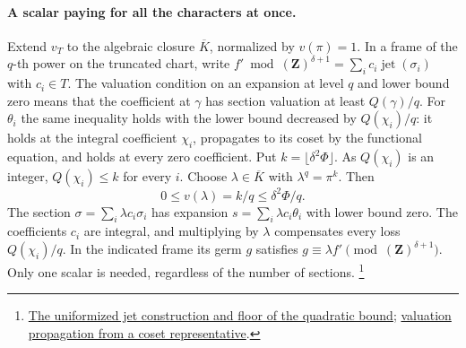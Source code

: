 \paragraph{A scalar paying for all the characters at once.}
Extend \(v_T\) to the algebraic closure \(\overline K\), normalized
by \(v(\pi)=1\). In a frame of the \(q\)-th power on the truncated
chart, write \(f'\bmod(\boldsymbol Z)^{\delta+1}=\sum_i c_i
\operatorname{jet}(\sigma_i)\) with \(c_i\in T\).
The valuation condition on an expansion at level \(q\) and lower
bound zero means that the coefficient at \(\gamma\) has section
valuation at least \(Q(\gamma)/q\). For \(\theta_i\) the same
inequality holds with the lower bound decreased by \(Q(\chi_i)/q\):
it holds at the integral coefficient \(\chi_i\), propagates to its
coset by the functional equation, and holds at every zero coefficient.
Put \(k=\lfloor\delta^2\Phi\rfloor\). As \(Q(\chi_i)\) is an integer,
\(Q(\chi_i)\le k\) for every \(i\). Choose \(\lambda\in\overline K\)
with \(\lambda^q=\pi^k\). Then
\[
     0\le v(\lambda)=k/q\le\delta^2\Phi/q .
\]
The section \(\sigma=\sum_i\lambda c_i\sigma_i\) has expansion
\(s=\sum_i\lambda c_i\theta_i\) with lower bound zero. The
coefficients \(c_i\) are integral, and multiplying by \(\lambda\)
compensates every loss \(Q(\chi_i)/q\).
In the indicated frame its germ \(g\) satisfies
\(g\equiv\lambda f'\pmod{(\boldsymbol Z)^{\delta+1}}\).
Only one scalar is needed, regardless of the number of sections.
\footnote{\href{https://github.com/ChristianKudeba/alpoge-rh-verification/blob/alpoge-source-7cbf7a0c/src/Development/AbelianVarietyTheory/Proofs/JetHarmonics/ExistsPowFrame.lean}{The uniformized jet construction and floor of the quadratic bound};
\href{https://github.com/ChristianKudeba/alpoge-rh-verification/blob/alpoge-source-7cbf7a0c/src/Development/AbelianVarietyTheory/Proofs/JetHarmonics/ExistsGenOfTop.lean}{valuation propagation from a coset representative}.}

